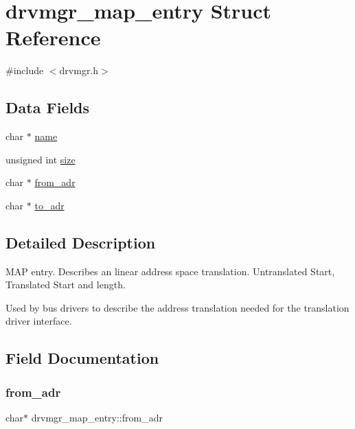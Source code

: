 \hypertarget{structdrvmgr__map__entry}{}\section{drvmgr\+\_\+map\+\_\+entry Struct Reference}
\label{structdrvmgr__map__entry}


{\ttfamily \#include $<$drvmgr.\+h$>$}

\subsection*{Data Fields}
\begin{DoxyCompactItemize}
\item 
char $\ast$ \mbox{\hyperlink{structdrvmgr__map__entry_ab2f1dd43f429f44321b1671b23138f14}{name}}
\item 
unsigned int \mbox{\hyperlink{structdrvmgr__map__entry_a6e86bd0c574cd6f7ef1046a4864caccd}{size}}
\item 
char $\ast$ \mbox{\hyperlink{structdrvmgr__map__entry_adbeca87a3a7df8d429d4c0110921953f}{from\+\_\+adr}}
\item 
char $\ast$ \mbox{\hyperlink{structdrvmgr__map__entry_acd883f6a4d144d58dee3264da6fa9d38}{to\+\_\+adr}}
\end{DoxyCompactItemize}


\subsection{Detailed Description}
M\+AP entry. Describes an linear address space translation. Untranslated Start, Translated Start and length.

Used by bus drivers to describe the address translation needed for the translation driver interface. 

\subsection{Field Documentation}
\mbox{\label{structdrvmgr__map__entry_adbeca87a3a7df8d429d4c0110921953f}} 
\subsubsection{\texorpdfstring{from\_adr}{from\_adr}}
{\footnotesize\ttfamily char$\ast$ drvmgr\+\_\+map\+\_\+entry\+::from\+\_\+adr}


